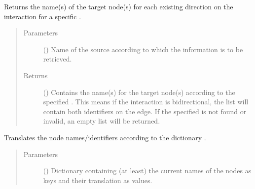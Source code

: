 \documentclass[letterpaper,10pt,english]{sphinxmanual}
\begin{document}
\begin{fulllineitems}
\begin{fulllineitems}
\begin{quote}
\begin{description}
\end{description}\end{quote}

\end{fulllineitems}


\begin{fulllineitems}
\label{\detokenize{reference:pypath.main.Direction.tgt_by_source}}
Returns the name(s) of the target node(s) for each existing
direction on the interaction for a specific .
\begin{quote}\begin{description}
\item[{Parameters}] \leavevmode
{} () \textendash{} Name of the source according to which the information is to
be retrieved.

\item[{Returns}] \leavevmode
() \textendash{} Contains the name(s) for the target node(s)
according to the specified . This means if the
interaction is bidirectional, the list will contain both
identifiers on the edge. If the specified  is not
found or invalid, an empty list will be returned.

\end{description}\end{quote}

\end{fulllineitems}


\begin{fulllineitems}
\label{\detokenize{reference:pypath.main.Direction.translate}}
Translates the node names/identifiers according to the
dictionary .
\begin{quote}\begin{description}
\item[{Parameters}] \leavevmode
{} () \textendash{} Dictionary containing (at least) the current names of the
nodes as keys and their translation as values.


\end{description}
\end{quote}
\end{fulllineitems}
\end{fulllineitems}
\end{document}
